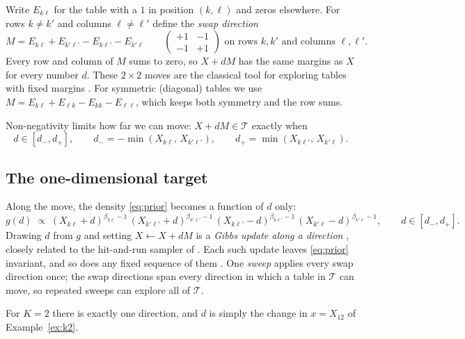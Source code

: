 \documentclass[11pt,a4paper]{article}
\theoremstyle{definition}
\theoremstyle{remark}
\newcommand{\T}{\mathcal{T}}
\begin{document}
Write $E_{k\ell}$ for the table with a $1$ in position $(k,\ell)$ and zeros
elsewhere. For rows $k \ne k'$ and columns $\ell \ne \ell'$ define the
\emph{swap direction}
\begin{equation}
  M = E_{k\ell} + E_{k'\ell'} - E_{k\ell'} - E_{k'\ell}
  \qquad
  \begin{pmatrix} +1 & -1 \\ -1 & +1 \end{pmatrix}
  \text{ on rows } k,k' \text{ and columns } \ell,\ell'.
\end{equation}
Every row and column of $M$ sums to zero, so $X + dM$ has the same margins as
$X$ for every number $d$. These $2\times2$ moves are the classical tool for
exploring tables with fixed margins
\citep{diaconis1995rectangular,diaconis1998algebraic}. For symmetric
(diagonal) tables we use $M = E_{k\ell} + E_{\ell k} - E_{kk} - E_{\ell\ell}$,
which keeps both symmetry and the row sums.

Non-negativity limits how far we can move: $X + dM \in \T$ exactly when
\begin{equation}
  d \in [d_-, d_+], \qquad
  d_- = -\min(X_{k\ell},\, X_{k'\ell'}), \qquad
  d_+ = \min(X_{k\ell'},\, X_{k'\ell}).
\end{equation}

\subsection{The one-dimensional target}

Along the move, the density \eqref{eq:prior} becomes a function of $d$ only:
\begin{equation}
  \label{eq:onedim}
  g(d) \;\propto\;
  (X_{k\ell} + d)^{\beta_{k\ell}-1}\,
  (X_{k'\ell'} + d)^{\beta_{k'\ell'}-1}\,
  (X_{k\ell'} - d)^{\beta_{k\ell'}-1}\,
  (X_{k'\ell} - d)^{\beta_{k'\ell}-1},
  \qquad d \in [d_-, d_+].
\end{equation}
Drawing $d$ from $g$ and setting $X \leftarrow X + dM$ is a \emph{Gibbs
update along a direction} \citep{gelfand1990sampling}, closely related to
the hit-and-run sampler of \citet{smith1984efficient}. Each such update
leaves \eqref{eq:prior} invariant, and so does any fixed sequence of them
\citep[Section~2.4]{tierney1994markov}. One \emph{sweep} applies every swap
direction once; the swap directions span every direction in which a table in
$\T$ can move, so repeated sweeps can explore all of $\T$.

For $K=2$ there is exactly one direction, and $d$ is simply the change in
$x = X_{12}$ of Example~\ref{ex:k2}.
\end{document}

